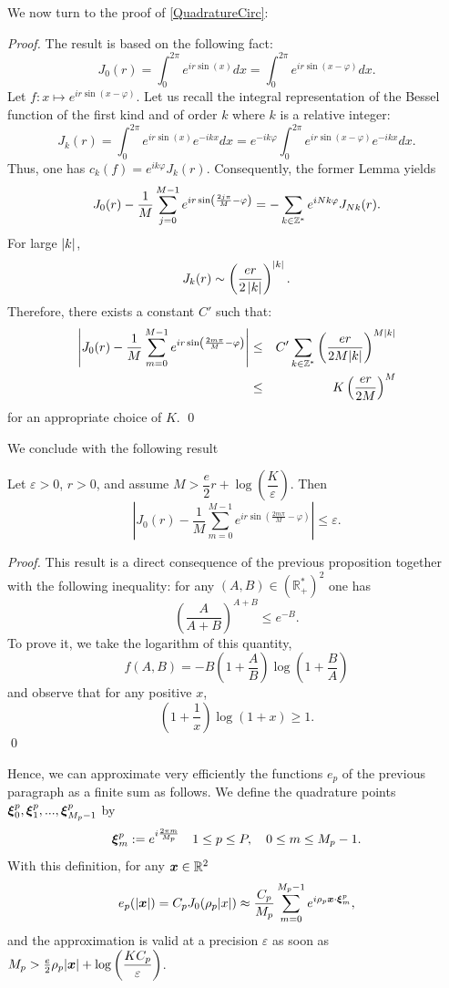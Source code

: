 \documentclass[smallextended]{svjour3}
\begin{document}
\noindent We now turn to the proof of \autoref{QuadratureCirc}: 
\begin{proof}
	The result is based on the following fact: 
	\[J_0(r) =  \int_0^{2\pi} e^{ir\sin(x)}dx = \int_0^{2\pi} e^{ir\sin(x - \varphi)}dx.\] 
	Let $f : x \mapsto e^{ir\sin(x - \varphi)}$. Let us recall the integral representation of the Bessel function of the first kind and of order $k$ where $k$ is a relative integer: \[J_k(r) =  \int_{0}^{2\pi}e^{ir\sin(x)}e^{-ikx}dx =  e^{-ik\varphi}\int_{0}^{2\pi}e^{ir\sin(x - \varphi)}e^{-ikx}dx.\] Thus, one has $c_k(f) = e^{ik\varphi}J_k(r)$. Consequently, the former Lemma yields 
	\[J_0(r) -  \dfrac{1}{M} \sum_{j=0}^{M-1} e^{ir \sin \left( \frac{2j\pi}{M}-\varphi \right)} = -\sum_{k\in \mathbb{Z}^*}e^{iNk\varphi}J_{Nk}(r).\] 
	For large $\left\lvert k \right\rvert$, 
	\[J_k(r) \sim \left(\dfrac{er}{2\left\lvert k \right\rvert}\right)^{\left\lvert k \right\rvert}.\]
	Therefore, there exists a constant $C'$ such that: 
	\begin{eqnarray*}
		\left\lvert J_0(r) -  \dfrac{1}{M}\sum_{m=0}^{M-1}e^{ir\sin\left(\frac{2m\pi}{M}-\varphi\right)} \right\rvert &\leq& C' \sum_{k\in \mathbb{Z}^*} \left(\dfrac{er}{2M|k|}\right)^{M|k|}\\
		&\leq& K \left(\dfrac{er}{2M}\right)^M 
	\end{eqnarray*}
	for an appropriate choice of $K$.	
	\qed
\end{proof}
We conclude with the following result
\begin{proposition} Let $\varepsilon >0$, $r>0$, and assume $M > \dfrac{e}{2}r + \log\left(\dfrac{K}{\varepsilon}\right)$. Then 
	\[\left|J_0(r) -  \dfrac{1}{M}\sum_{m=0}^{M-1}e^{ir\sin\left(\frac{2m\pi}{M}-\varphi\right)} \right| \leq \varepsilon.\]
	\label{suboptCirc}
\end{proposition}
\begin{proof}
	This result is a direct consequence of the previous proposition together with the following inequality: for any $(A,B) \in \left(\mathbb{R}_+^*\right)^2$ one has
	\[ \left( \dfrac{A}{A+B}\right)^{A+B} \leq e^{-B}.\]
	To prove it, we take the logarithm of this quantity, 
	\[f(A,B) = -B\left(1+\dfrac{A}{B}\right)\log\left(1+\dfrac{B}{A}\right)\]
	and observe that for any positive $x$, \[\left(1+\dfrac{1}{x}\right)\log(1+x) \geq 1.\]
	\qed
\end{proof}
																																																		
Hence, we can approximate very efficiently the functions $e_p$ of the previous paragraph as a finite sum as follows. We define the quadrature points $\boldsymbol{\xi}_0^p, \boldsymbol{\xi}_1^p, ..., \boldsymbol{\xi}^p_{M_p-1}$  by
\begin{equation}
	\label{defXimp}
	\boldsymbol{\xi}_m^p := \displaystyle e^{i\frac{2\pi m}{M_p}} \quad 1\leq p \leq P, \quad 0 \leq m \leq M_p -1.
\end{equation}
With this definition, for any $\boldsymbol{x} \in \mathbb{R}^2$
\[ e_p(|\boldsymbol{x}|) = C_p J_0(\rho_p |x|)\approx \dfrac{C_p}{M_p}\sum_{m=0}^{M_p-1}{e^{i \rho_p \boldsymbol{x} \cdot \boldsymbol{\xi}_m^p}},\]
and the approximation is valid at a precision $\varepsilon$ as soon as $M_p > \frac{e}{2}\rho_p|\boldsymbol{x}| + \log\left(\dfrac{KC_p}{\varepsilon}\right)$.
																																																		
\end{document}
